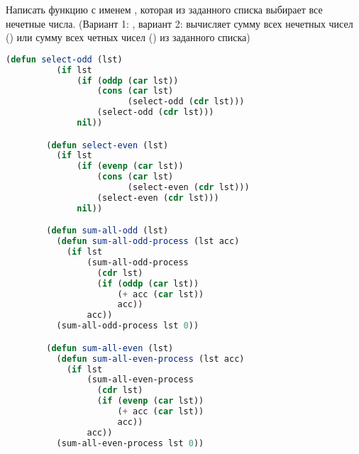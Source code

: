 \documentclass[a4paper,oneside,12pt]{extreport}
\begin{document}
\begin{task}
	Написать функцию с именем , которая из заданного списка выбирает все нечетные числа.
	(Вариант 1: , вариант 2: вычисляет сумму всех нечетных чисел () или сумму всех четных чисел () из заданного списка)

	\begin{lstlisting}[language=Lisp, gobble=16]
		(defun select-odd (lst)
		  (if lst
		      (if (oddp (car lst))
		          (cons (car lst)
		                (select-odd (cdr lst)))
		          (select-odd (cdr lst)))
		      nil))

		(defun select-even (lst)
		  (if lst
		      (if (evenp (car lst))
		          (cons (car lst)
		                (select-even (cdr lst)))
		          (select-even (cdr lst)))
		      nil))

		(defun sum-all-odd (lst)
		  (defun sum-all-odd-process (lst acc)
		    (if lst
		        (sum-all-odd-process
		          (cdr lst)
		          (if (oddp (car lst))
		              (+ acc (car lst))
		              acc))
		        acc))
		  (sum-all-odd-process lst 0))

		(defun sum-all-even (lst)
		  (defun sum-all-even-process (lst acc)
		    (if lst
		        (sum-all-even-process
		          (cdr lst)
		          (if (evenp (car lst))
		              (+ acc (car lst))
		              acc))
		        acc))
		  (sum-all-even-process lst 0))
	\end{lstlisting}
\end{task}
\end{document}
